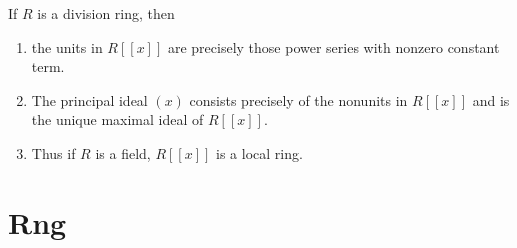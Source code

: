 \begin{corollary}
    If $R$ is a division ring, then
    \begin{enumerate}
        \item
              the units in $R[[x]]$ are precisely those power series with nonzero constant term.
        \item
              The principal ideal $(x)$ consists precisely of the nonunits in $R[[x]]$ and is the unique maximal ideal of $R[[x]]$.

        \item
              Thus if $R$ is a field, $R[[x]]$ is a local ring.
    \end{enumerate}
\end{corollary}


\chapter*{Rng} %









